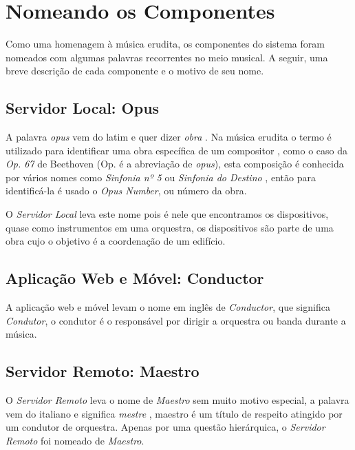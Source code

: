 \section{Nomeando os Componentes}
\label{sec:nomeando-componentes}

Como uma homenagem à música erudita, os componentes do sistema foram nomeados
com algumas palavras recorrentes no meio musical. A seguir, uma breve descrição
de cada componente e o motivo de seu nome.

\subsection{Servidor Local: \textbf{Opus}}
A palavra \emph{opus} vem do latim e quer dizer \emph{obra} \cite{opuslatin}. Na música
erudita o termo é utilizado para identificar uma obra específica de um compositor \cite{opusnumber}, 
como o caso da \emph{Op. 67} de Beethoven (Op. é a abreviação de \emph{opus}), esta
composição é conhecida por vários nomes como \emph{Sinfonia nº 5} ou 
\emph{Sinfonia do Destino} \cite{beethoven1}, então para identificá-la é usado o \emph{Opus Number},
ou número da obra.

O \emph{Servidor Local} leva este nome pois é nele que encontramos os dispositivos,
quase como instrumentos em uma orquestra, os dispositivos são parte de uma obra cujo
o objetivo é a coordenação de um edifício.

\subsection{Aplicação Web e Móvel: \textbf{Conductor}}
A aplicação web e móvel levam o nome em inglês de \emph{Conductor}, que significa
\emph{Condutor}, o condutor é o responsável por dirigir a orquestra ou banda durante
a música.

\subsection{Servidor Remoto: \textbf{Maestro}}
O \emph{Servidor Remoto} leva o nome de \emph{Maestro} sem muito motivo especial,
a palavra vem do italiano e significa \emph{mestre} \cite{maestro-cambridge}, maestro é um título de respeito 
atingido por um condutor de orquestra. Apenas por uma questão hierárquica,
o \emph{Servidor Remoto} foi nomeado de \emph{Maestro}.